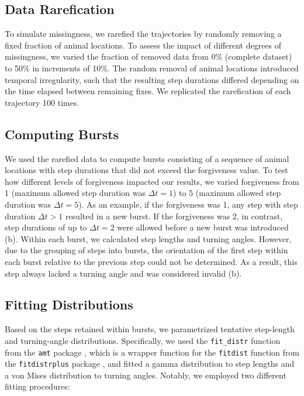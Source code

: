 \documentclass[../FinalThesis.tex]{subfiles}
\begin{document}
\subsection{Data Rarefication}

To simulate missingness, we rarefied the trajectories by randomly removing a
fixed fraction of animal locations. To assess the impact of different degrees of
missingness, we varied the fraction of removed data from 0\% (complete dataset)
to 50\% in increments of 10\%. The random removal of animal locations introduced
temporal irregularity, such that the resulting step durations differed depending
on the time elapsed between remaining fixes. We replicated the rarefication of
each trajectory 100 times.

\subsection{Computing Bursts}

We used the rarefied data to compute bursts consisting of a sequence of
animal locations with step durations that did not exceed the forgiveness value.
To test how different levels of forgiveness impacted our results, we varied
forgiveness from 1 (maximum allowed step duration was $\Delta t = 1$) to 5
(maximum allowed step duration was $\Delta t = 5$). As an example, if the
forgiveness was 1, any step with step duration $\Delta t > 1$ resulted in a new
burst. If the forgiveness was 2, in contrast, step durations of up to $\Delta t
= 2$ were allowed before a new burst was introduced (b). Within
each burst, we calculated step lengths and turning angles. However, due to the
grouping of steps into bursts, the orientation of the first step within each
burst relative to the previous step could not be determined. As a result, this
step always lacked a turning angle and was considered invalid
(b).

\subsection{Fitting Distributions}

Based on the steps retained within bursts, we parametrized tentative step-length
and turning-angle distributions. Specifically, we used the \texttt{fit\_distr}
function from the \texttt{amt} package \citep{Signer.2019}, which is a wrapper
function for the \texttt{fitdist} function from the \texttt{fitdistrplus}
package \citep{Delignette-Muller.2015}, and fitted a gamma distribution to
step lengths and a von Mises distribution to turning angles. Notably, we
employed two different fitting procedures:
\end{document}
